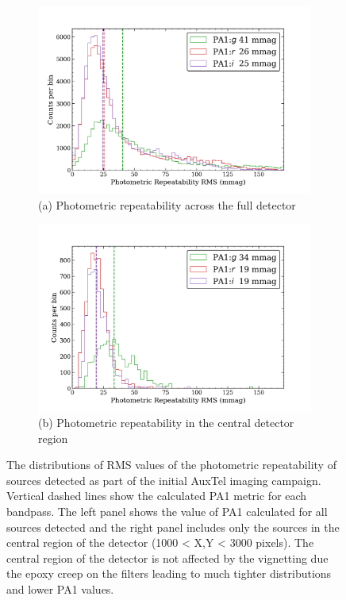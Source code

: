 \begin{figure}[!ht]
\begin{subfigure}{.5\textwidth}
    \centering
    \includegraphics[width=1.1\textwidth]{figures/pa1_auxtel}
     \caption[\small]{(a) Photometric repeatability across the full detector}
\end{subfigure}%
\begin{subfigure}{.5\textwidth} 
    \centering
    \includegraphics[width=1.1\textwidth]{figures/pa1_auxtel_central}
    \caption[\small]{(b) Photometric repeatability in the central detector region}
\end{subfigure}
\par\medskip %
\caption[short]{The distributions of RMS values of the photometric repeatability of sources detected as part of the initial AuxTel imaging campaign. Vertical dashed lines show the calculated PA1 metric for each bandpass. The left panel shows the value of PA1 calculated for all sources detected and the right panel includes only the sources in the central region of the detector (1000 < X,Y < 3000 pixels). The central region of the detector is not affected by the vignetting due the epoxy creep on the filters leading to much tighter distributions and lower PA1 values.}
\label{fig:faro_auxtel_metrics}
\end{figure}

